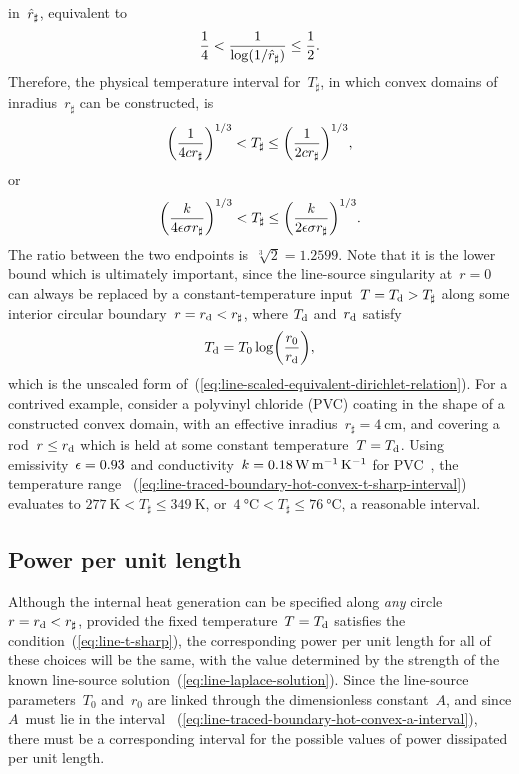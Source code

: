 in~$\hat{r}_\sharp$,
equivalent to
\begin{equation}
  \frac{1}{4} < \frac{1}{\log (1 / \hat{r}_\sharp)} \le \frac{1}{2}.
  \label{eq:line-traced-boundary-hot-convex-log-r-sharp-interval}
\end{equation}
Therefore, the physical temperature interval for~$T_\sharp$,
in which convex domains of inradius~$r_\sharp$ can be constructed,
is
\[
  \roundbr*{\frac{1}{4 c r_\sharp}}^{1/3}
    <
  T_\sharp
    \le
  \roundbr*{\frac{1}{2 c r_\sharp}}^{1/3},
\]
or
\begin{equation}
  \roundbr*{\frac{\conduc}{4 \emiss \stefan r_\sharp}}^{1/3}
    <
  T_\sharp
    \le
  \roundbr*{\frac{\conduc}{2 \emiss \stefan r_\sharp}}^{1/3}.
  \label{eq:line-traced-boundary-hot-convex-t-sharp-interval}
\end{equation}
The ratio between the two endpoints is~$\sqrt[3]{2} = 1.2599$.
Note that it is the lower bound which is ultimately important,
since the line-source singularity at~$r = 0$
can always be replaced by a constant-temperature input~$T = T_{\mathrm{d}} > T_\sharp$
along some interior circular boundary~$r = r_{\mathrm{d}} < r_\sharp$,
where $T_{\mathrm{d}}$ and~$r_{\mathrm{d}}$ satisfy
\begin{equation}
  T_\dir = T_0 \log \roundbr*{\frac{r_0}{r_\dir}},
  \label{eq:line-equivalent-dirichlet-relation}
\end{equation}
which is the unscaled form
of~(\ref{eq:line-scaled-equivalent-dirichlet-relation}).
For a contrived example,
consider a polyvinyl chloride (PVC) coating
in the shape of a constructed convex domain,
with an effective inradius~$r_\sharp = \SI{4}{\centi\metre}$,
and covering a rod~$r \le r_{\mathrm{d}}$
which is held at some constant temperature~$T = T_{\mathrm{d}}$.
Using emissivity~$\epsilon = 0.93$
and conductivity~$k = \SI{0.18}{\watt \per\metre \per\kelvin}$
for PVC~\cite[Table~2]{lucchi-2018-transient-radiative-rotating-pvc},
the temperature range~%
  (\ref{eq:line-traced-boundary-hot-convex-t-sharp-interval})
evaluates to $\SI{277}{\kelvin} < T_\sharp \le \SI{349}{\kelvin}$,
or~$\SI{4}{\degreeCelsius} < T_\sharp \le \SI{76}{\degreeCelsius}$,
a reasonable interval.

\subsection{Power per unit length}
\label{sec:polar.physical.power}

Although the internal heat generation can be specified
along \emph{any} circle~$r = r_{\mathrm{d}} < r_\sharp$,
provided the fixed temperature~$T = T_{\mathrm{d}}$
satisfies the condition~(\ref{eq:line-t-sharp}),
the corresponding power per unit length
for all of these choices will be the same,
with the value determined by the strength
of the known line-source solution~(\ref{eq:line-laplace-solution}).
Since the line-source parameters~$T_0$ and~$r_0$ are linked
through the dimensionless constant~$A$,
and since $A$~must lie in the interval~%
  (\ref{eq:line-traced-boundary-hot-convex-a-interval}),
there must be a corresponding interval for the possible values of
power dissipated per unit length.

